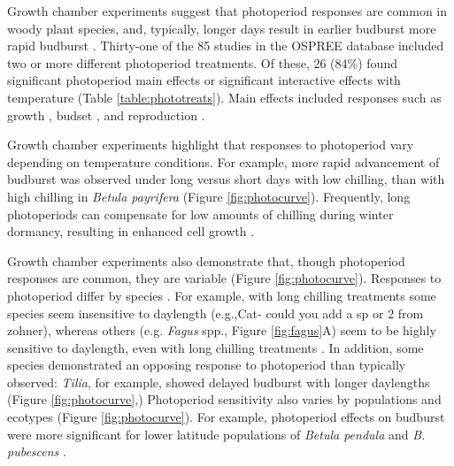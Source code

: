 \documentclass{article}
\begin{document}
\par Growth chamber experiments suggest that photoperiod responses are common in woody plant species, and, typically, longer days result in earlier budburst more rapid budburst \citep [e.g., ][]{Caffarra:2011a}. Thirty-one of the 85 studies in the OSPREE database included two or more different photoperiod treatments. Of these, 26 (84\%) found significant photoperiod main effects or significant interactive effects with temperature (Table \ref{table:phototreats}). Main effects included responses such as growth \citep[e.g., higher growth rates with longer days ][]{Ashby:1962aa}, budset \citep[e.g., more rapid induction of budset with shorter days][]{Howe:1995aa}, and reproduction \citep[e.g., increased flowering with longer days ][]{Heide:2012aa}. 
\par Growth chamber experiments highlight that responses to photoperiod vary depending on temperature conditions. For example, more rapid advancement of budburst was observed under long versus short days with low chilling, than with high chilling in \emph{Betula payrifera} \citep{Hawkins:2012,} (Figure \ref{fig:photocurve}). Frequently, long photoperiods can compensate for low amounts of chilling during winter dormancy, resulting in enhanced cell growth \citep{Heide:1993,Myking:1995,Caffarra:2011b}.
\par Growth chamber experiments also demonstrate that, though photoperiod responses are common, they are variable (Figure \ref{fig:photocurve}). Responses to photoperiod differ by species \citep[e.g.,][]{Heide:1993a,Howe:1996,Basler:2012, Basler:2014aa,zohner2016,flynn2018}. For example, with long chilling treatments some species seem insensitive to daylength (e.g.,Cat- could you add a sp or 2 from zohner), whereas others (e.g. \emph{Fagus} spp., Figure \ref{fig:fagus}A) seem to be highly sensitive to daylength, even with long chilling treatments \citep{zohner2016}. In addition, some species demonstrated an opposing response to photoperiod than typically observed: \emph{Tilia}, for example, showed delayed budburst with longer daylengths (Figure \ref{fig:photocurve},\citep{Ashby:1962aa}) %
Photoperiod sensitivity also varies by populations and ecotypes \citep[e.g.,][]{Partanen:2005aa,flynn2018} (Figure \ref{fig:photocurve}). For example, photoperiod effects on budburst were more significant for lower latitude populations of \emph{Betula pendula} and \emph{B. pubescens} \citep{Partanen:2005aa}. 
\end{document}
